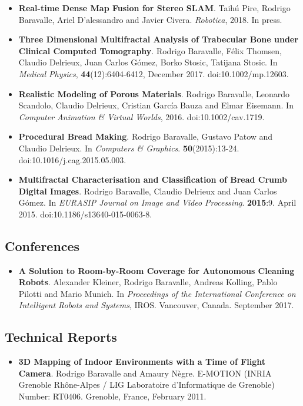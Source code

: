 \documentclass[a4paper,11pt]{article}
\begin{document}
\begin{itemize}
\item {\bf Real-time Dense Map Fusion for Stereo SLAM}. Taihú Pire, Rodrigo Baravalle, Ariel D'alessandro and Javier Civera. {\it Robotica}, 2018. In press.
\item {\bf Three Dimensional Multifractal Analysis of Trabecular Bone under Clinical Computed Tomography}. Rodrigo Baravalle, Félix Thomsen, Claudio Delrieux, Juan Carlos Gómez, Borko Stosic, Tatijana Stosic. In {\it Medical Physics}, {\bf 44}(12):6404-6412, December 2017. doi:10.1002/mp.12603.
\item {\bf Realistic Modeling of Porous Materials}. Rodrigo Baravalle, Leonardo Scandolo, Claudio Delrieux, Cristian García Bauza and Elmar Eisemann. In {\it Computer Animation \& Virtual Worlds}, 2016. doi:10.1002/cav.1719.
\item {\bf Procedural Bread Making}. Rodrigo Baravalle, Gustavo Patow and Claudio Delrieux. In {\it Computers \& Graphics}. {\bf 50}(2015):13-24. doi:10.1016/j.cag.2015.05.003.
\item {\bf Multifractal Characterisation and Classification of Bread Crumb Digital Images}. Rodrigo Baravalle, Claudio Delrieux and Juan Carlos Gómez. In {\it EURASIP Journal on Image and Video Processing}. {\bf 2015}:9. April 2015. doi:10.1186/s13640-015-0063-8.
\end{itemize}


\subsection*{\color{niceblue} Conferences}
\begin{itemize}
\item {\bf A Solution to Room-by-Room Coverage for Autonomous Cleaning Robots}. Alexander Kleiner, Rodrigo Baravalle, Andreas Kolling, Pablo Pilotti and Mario Munich. In {\it Proceedings of the International Conference on Intelligent Robots and Systems}, IROS. Vancouver, Canada. September 2017.
\end{itemize}

\subsection*{\color{niceblue} Technical Reports}
\begin{itemize}
\item {\bf 3D Mapping of Indoor Environments with a Time of Flight Camera}. Rodrigo Baravalle and Amaury N\`egre. E-MOTION (INRIA Grenoble Rh\^one-Alpes / LIG Laboratoire d'Informatique de Grenoble) Number: RT0406. Grenoble, France, February 2011.
\end{itemize}
\end{document}
